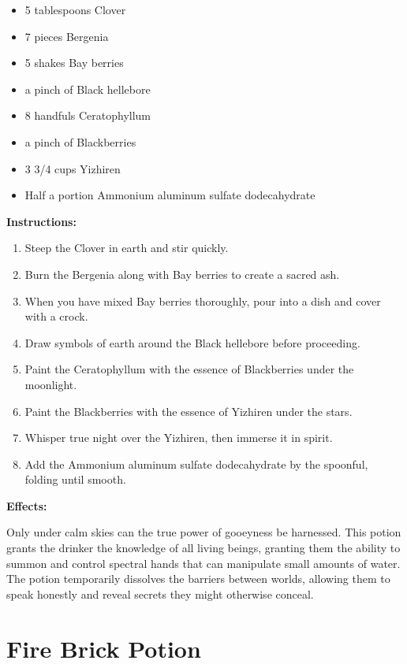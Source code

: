 \documentclass{article}
\begin{document}
\begin{itemize}
  \item 5 tablespoons Clover
  \item 7 pieces Bergenia
  \item 5 shakes Bay berries
  \item a pinch of Black hellebore
  \item 8 handfuls Ceratophyllum
  \item a pinch of Blackberries
  \item 3 3/4 cups Yizhiren
  \item Half a portion Ammonium aluminum sulfate dodecahydrate
\end{itemize}

\textbf{Instructions:}

\begin{enumerate}
  \item Steep the Clover in earth and stir quickly.
  \item Burn the Bergenia along with Bay berries to create a sacred ash.
  \item When you have mixed Bay berries thoroughly, pour into a dish and cover with a crock.
  \item Draw symbols of earth around the Black hellebore before proceeding.
  \item Paint the Ceratophyllum with the essence of Blackberries under the moonlight.
  \item Paint the Blackberries with the essence of Yizhiren under the stars.
  \item Whisper true night over the Yizhiren, then immerse it in spirit.
  \item Add the Ammonium aluminum sulfate dodecahydrate by the spoonful, folding until smooth.
\end{enumerate}

\textbf{Effects:}

Only under calm skies can the true power of gooeyness be harnessed. This potion grants the drinker the knowledge of all living beings, granting them the ability to summon and control spectral hands that can manipulate small amounts of water. The potion temporarily dissolves the barriers between worlds, allowing them to speak honestly and reveal secrets they might otherwise conceal.

\newpage
\section*{Fire Brick Potion}
\end{document}
